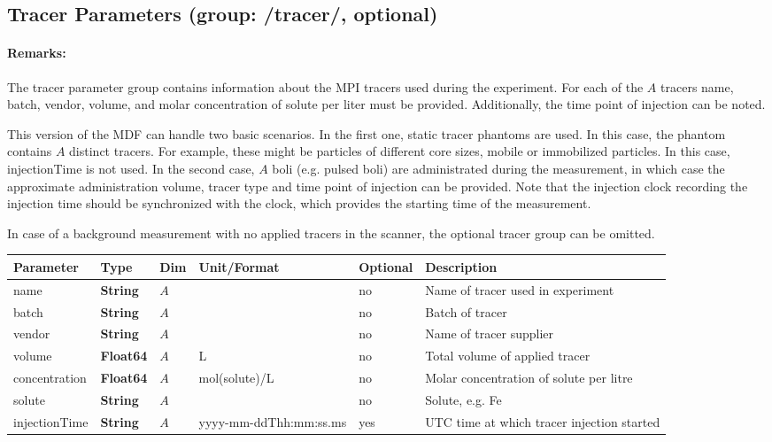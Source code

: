 \documentclass[landscape,a4paper]{article} %
\newcommand{\inltab}[1]{{\ttfamily\bfseries\color{blue}#1}}
\newcommand{\inlvar}[1]{{\ttfamily#1}}
\begin{document}
\subsection{Tracer Parameters (group: \inlvar{/tracer/}, optional)}

\begin{multicols}{2}
\paragraph{Remarks:} The tracer parameter group contains information about the MPI tracers used during the experiment. For each of the $A$ tracers \inlvar{name}, \inlvar{batch}, \inlvar{vendor}, \inlvar{volume},  and molar \inlvar{concentration} of \inlvar{solute} per liter must be provided. Additionally, the time point of injection can be noted.

This version of the MDF can handle two basic scenarios. In the first one, static tracer phantoms are used. In this case, the phantom contains $A$ distinct tracers. For example, these might be particles of different core sizes, mobile or immobilized particles. In this case, \inlvar{injectionTime} is not used. In the second case, $A$ boli (e.g. pulsed boli) are administrated during the measurement, in which case the approximate administration volume, tracer type and time point of injection can be provided. Note that the injection clock recording the injection time should be synchronized with the clock, which provides the starting time of the measurement.

In case of a background measurement with no applied tracers in the scanner, the optional tracer group can be omitted.
\end{multicols}

\noindent \begin{tabularx}{\columnwidth}{lllllX} 
\textbf{Parameter} & \textbf{Type} & \textbf{Dim} & \textbf{Unit/Format} & \textbf{Optional} & \textbf{Description} \\ \hline 
\inlvar{name} & \inltab{String} & $A$ & & no & Name of tracer used in experiment \\ \hline
\inlvar{batch} & \inltab{String} & $A$ & & no & Batch of tracer \\ \hline
\inlvar{vendor} & \inltab{String} & $A$ & & no & Name of tracer supplier \\ \hline
\inlvar{volume} & \inltab{Float64} & $A$ & L & no & Total volume of applied tracer \\ \hline
\inlvar{concentration} & \inltab{Float64} & $A$ & mol(\inlvar{solute})/L & no & Molar concentration of \inlvar{solute} per litre \\ \hline
\inlvar{solute} & \inltab{String} & $A$ & & no & Solute, e.g. Fe \\ \hline
\inlvar{injectionTime} & \inltab{String} & $A$ & yyyy-mm-ddThh:mm:ss.ms & yes & UTC time at which tracer injection started \\ \hline
\end{tabularx}
\end{document}
